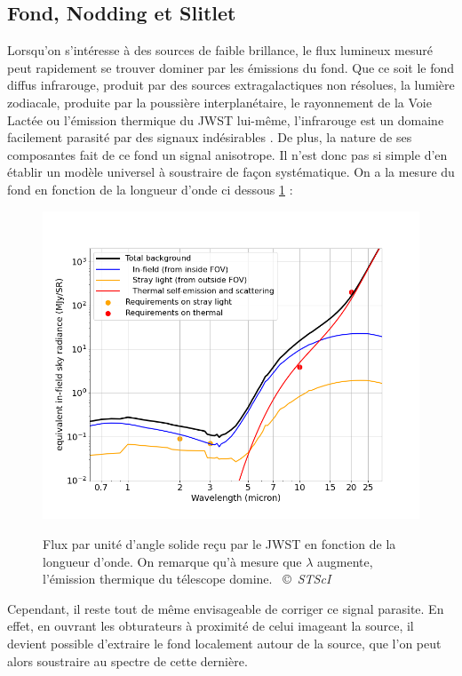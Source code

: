 \documentclass[11pt, a4paper]{article}
\newcommand{\customcite}[2]{\mbox{
  {\small \copyright} \textit{#1} \cite{#2}}
}
\begin{document}
\subsection{Fond, Nodding et Slitlet}

Lorsqu'on s'intéresse à des sources de faible brillance, le flux lumineux mesuré peut rapidement se trouver dominer par les émissions du fond. Que ce soit le fond diffus infrarouge, produit par des sources extragalactiques non résolues, la lumière zodiacale, produite par la poussière interplanétaire, le rayonnement de la Voie Lactée ou l'émission thermique du JWST lui-même, l'infrarouge est un domaine facilement parasité par des signaux indésirables \cite{jwst_background}. De plus, la nature de ses composantes fait de ce fond un signal anisotrope. Il n'est donc pas si simple d'en établir un modèle universel à soustraire de façon systématique. On a la mesure du fond en fonction de la longueur d'onde ci dessous \ref{fig:background_jwst} : 

\begin{figure}[H]
  \centering
  \includegraphics[scale=0.4]{assets/background_jwst.png}
  \label{fig:background_jwst}
  \caption{Flux par unité d'angle solide reçu par le JWST en fonction de la longueur d'onde. On remarque qu'à mesure que $\lambda$ augmente, l'émission thermique du télescope domine. \customcite{STScI}{jwst_background}}
\end{figure}


Cependant, il reste tout de même envisageable de corriger ce signal parasite. En effet, en ouvrant les obturateurs à proximité de celui imageant la source, il devient possible d'extraire le fond localement autour de la source, que l'on peut alors soustraire au spectre de cette dernière.
\end{document}
